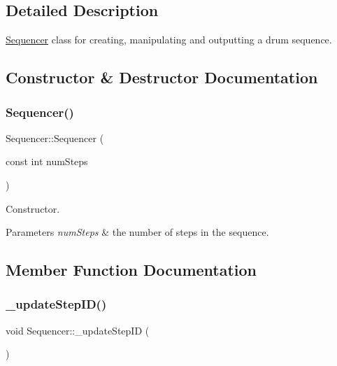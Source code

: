 \subsection{Detailed Description}
\hyperlink{classdrumpi_1_1Sequencer}{Sequencer} class for creating, manipulating and outputting a drum sequence. 

\subsection{Constructor \& Destructor Documentation}
\mbox{\label{classdrumpi_1_1Sequencer_ae1c19c8eadf10ac7ef53fa9b8b9d36e9}} 
\subsubsection{\texorpdfstring{Sequencer()}{Sequencer()}}
{\footnotesize\ttfamily Sequencer\+::\+Sequencer (\begin{DoxyParamCaption}\item[{const int}]{num\+Steps }\end{DoxyParamCaption})}

Constructor. 
\begin{DoxyParams}{Parameters}
{\em num\+Steps} & the number of steps in the sequence. \\
\hline
\end{DoxyParams}


\subsection{Member Function Documentation}
\mbox{\label{classdrumpi_1_1Sequencer_a55a080037b948534ef6fab28ee3cf8e1}} 
\subsubsection{\texorpdfstring{\+\_\+update\+Step\+I\+D()}{\_updateStepID()}}
{\footnotesize\ttfamily void Sequencer\+::\+\_\+update\+Step\+ID (\begin{DoxyParamCaption}{ }\end{DoxyParamCaption})\hspace{0.3cm}{\ttfamily [private]}}

